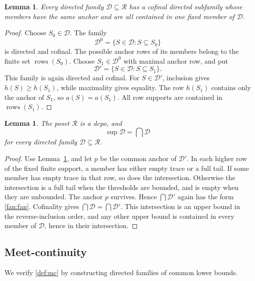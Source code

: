 \documentclass[fleqn,preprint,3p,a4paper]{elsarticle}
\newtheorem{lemma}[theorem]{Lemma}
\theoremstyle{definition}
\newcommand{\RR}{\mathcal R}
\newcommand{\rows}{\operatorname{rows}}
\begin{document}
\begin{lemma}\label{fan:anchor}
Every directed family $\mathcal D\subseteq\RR$ has a cofinal directed subfamily whose members have the same anchor and are all contained in one fixed member of $\mathcal D$.
\end{lemma}
\begin{proof}
Choose $S_0\in\mathcal D$. The family
\[
 \mathcal D^0=\{S\in\mathcal D:S\subseteq S_0\}
\]
is directed and cofinal. The possible anchor rows of its members belong to the finite set $\rows(S_0)$. Choose $S_1\in\mathcal D^0$ with maximal anchor row, and put
\[
 \mathcal D'=\{S\in\mathcal D:S\subseteq S_1\}.
\]
This family is again directed and cofinal. For $S\in\mathcal D'$, inclusion gives $h(S)\geq h(S_1)$, while maximality gives equality. The row $h(S_1)$ contains only the anchor of $S_1$, so $a(S)=a(S_1)$. All row supports are contained in $\rows(S_1)$.
\end{proof}

\begin{lemma}\label{fan:dcpo}
The poset $\RR$ is a dcpo, and
\[
 \sup\mathcal D=\bigcap\mathcal D
\]
for every directed family $\mathcal D\subseteq\RR$.
\end{lemma}
\begin{proof}
Use Lemma~\ref{fan:anchor}, and let $p$ be the common anchor of $\mathcal D'$. In each higher row of the fixed finite support, a member has either empty trace or a full tail. If some member has empty trace in that row, so does the intersection. Otherwise the intersection is a full tail when the thresholds are bounded, and is empty when they are unbounded. The anchor $p$ survives. Hence $\bigcap\mathcal D'$ again has the form \eqref{fan:fan}. Cofinality gives $\bigcap\mathcal D=\bigcap\mathcal D'$. This intersection is an upper bound in the reverse-inclusion order, and any other upper bound is contained in every member of $\mathcal D$, hence in their intersection.
\end{proof}

\subsection{Meet-continuity}
We verify \eqref{def:mc} by constructing directed families of common lower bounds.
\end{document}
